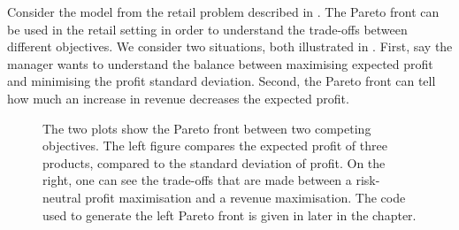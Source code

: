 \documentclass[main.tex]{subfiles}
\begin{document}
\begin{example}\label{ex:retail_pareto}
  Consider the model from the retail problem described in
  .
  The Pareto front can be used in the retail setting in order to understand the
  trade-offs between different objectives.
  We consider two situations, both illustrated in
  .
  First, say the manager wants to understand the balance between
  maximising expected profit and minimising the profit standard
  deviation.
  Second, the Pareto front can tell how much an increase in revenue
  decreases the expected profit.
  \begin{figure}[htbp]
    \centering
    \begin{subfigure}[h]{.5\textwidth}
    \end{subfigure}%
    \begin{subfigure}[h]{.5\textwidth}
    \end{subfigure}
    \caption{The two plots show the Pareto front between two competing
      objectives. The left figure compares the expected profit of three
      products, compared to the standard deviation of profit.
      On the right, one can see the trade-offs that are made between
      a risk-neutral profit maximisation and a revenue maximisation.
      The code used to generate the left Pareto front is given in
       later in the chapter.
    }\label{fig:pareto_std_prof_rev}
  \end{figure}
\end{example}
\end{document}
